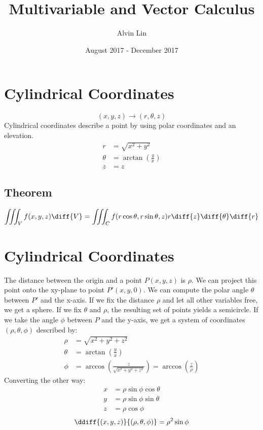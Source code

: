 \documentclass{math}
\title{Multivariable and Vector Calculus}
\author{Alvin Lin}
\date{August 2017 - December 2017}
\begin{document}
\maketitle

\section*{Cylindrical Coordinates}
\[ (x,y,z)\to(r,\theta,z) \]
Cylindrical coordinates describe a point by using polar coordinates and an
elevation.
\begin{align*}
  r &= \sqrt{x^2+y^2} \\
  \theta &= \arctan(\frac{y}{x}) \\
  z &= z
\end{align*}

\subsection*{Theorem}
\[ \iiint_{V}f(x,y,z)\diff{V} =
  \iiint_{C}f(r\cos\theta,r\sin\theta,z)r\diff{z}\diff{\theta}\diff{r} \]

\section*{Cylindrical Coordinates}
The distance between the origin and a point \( P(x,y,z) \) is \( \rho \). We
can project this point onto the xy-plane to point \( P'(x,y,0) \). We can
compute the polar angle \( \theta \) between \( P' \) and the x-axis. If we
fix the distance \( \rho \) and let all other variables free, we get a sphere.
If we fix \( \theta \) and \( \rho \), the resulting set of points yields a
semicircle. If we take the angle \( \phi \) between \( P \) and the y-axis,
we get a system of coordinates \( (\rho,\theta,\phi) \) described by:
\begin{align*}
  \rho &= \sqrt{x^2+y^2+z^2} \\
  \theta &= \arctan(\frac{y}{x}) \\
  \phi &= \arccos\left(\frac{z}{\sqrt{x^2+y^2+z^2}}\right) =
    \arccos\left(\frac{z}{\rho}\right)
\end{align*}
Converting the other way:
\begin{align*}
  x &= \rho\sin\phi\cos\theta \\
  y &= \rho\sin\phi\sin\theta \\
  z &= \rho\cos\phi
\end{align*}
\[ \ddiff{(x,y,z)}{(\rho,\theta,\phi)} = \rho^2\sin\phi \]
\end{document}
